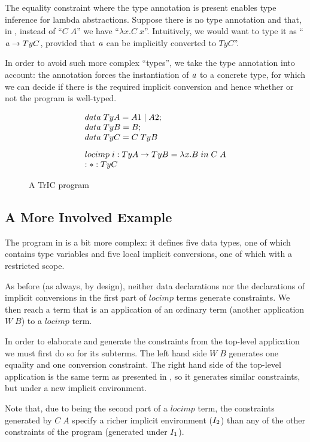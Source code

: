 The equality constraint where the type annotation is present enables type inference for lambda abstractions. Suppose there is no type annotation and that, in , instead of ``$C\;A$'' we have ``$\lambda x. C \;x$''. Intuitively, we would want to type it as ``$\mathit{a} \to TyC$, provided that $\mathit{a}$ can be implicitly converted to $TyC$''.

In order to avoid such more complex ``types'', we take the type annotation into account: the annotation forces the instantiation of $\mathit{a}$ to a concrete type, for which we can decide if there is the required implicit conversion and hence whether or not the program is well-typed.
\begin{figure}
     \[
\begin{array}{@{\hspace{0mm}}l@{\hspace{0mm}}}
  data\;TyA=A1\;|\;A2;\\
  data\;TyB=B;\\
  data\;TyC=C\;TyB\\[3mm]
  \monolocal{i}{TyA}{TyB}{\lambda \tmVar . B}{C\;A}\\
  :*: TyC
\end{array}
\]
\caption{A TrIC program}
\label{simple5}
\end{figure}
\subsection{A More Involved Example}
The program in  is a bit more complex: it defines five data types, one of which contains type variables and five local implicit conversions, one of which with a restricted scope.

As before (as always, by design), neither data declarations nor the declarations of implicit conversions in the first part of $locimp$ terms generate constraints. We then reach a term that is an application of an ordinary term (another application $W\;B$) to a $locimp$ term.

In order to elaborate and generate the constraints from the top-level application we must first do so for its subterms. The left hand side  $W\;B$ generates one equality and one conversion constraint. The right hand side of the top-level application is the same term as presented in , so it generates similar constraints, but under a new implicit environment.

Note that, due to being the second part of a $locimp$ term, the constraints generated by $C\;A$ specify a richer implicit environment ($I_2$) than any of the other constraints of the program (generated under $I_1$).

